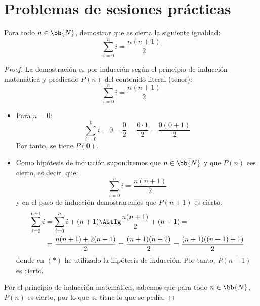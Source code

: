 \section{Problemas de sesiones prácticas}

\begin{ejercicio}\label{ej:1.1}
    Para todo $n\in \bb{N}$, demostrar que es cierta la siguiente igualdad:
    \begin{equation*}
        \sum_{i=0}^n i = \dfrac{n(n+1)}{2}
    \end{equation*}
    \begin{proof}
        La demostración es por inducción según el principio de inducción matemática y predicado $P(n)$ del contenido literal (tenor):
        \begin{equation*}
            \sum_{i=0}^n i = \dfrac{n(n+1)}{2}
        \end{equation*}

        \begin{itemize}
            \item \ul{Para $n=0$}:
            \begin{equation*}
                \sum_{i=0}^0 i = 0 = \frac{0}{2} = \frac{0\cdot 1}{2}
                 = \dfrac{0(0+1)}{2}
            \end{equation*}
            Por tanto, se tiene $P(0)$.

            \item Como hipótesis de inducción supondremos que $n\in \bb{N}$ y que $P(n)$ ees cierto, es decir, que:
            \begin{equation*}
                \sum_{i=0}^n i = \dfrac{n(n+1)}{2}
            \end{equation*}
            y en el paso de inducción demostraremos que $P(n+1)$ es cierto.
            \begin{align*}
                \sum_{i=0}^{n+1} i &= \sum_{i=0}^n i + (n+1)
                \AstIg \dfrac{n(n+1)}{2} + (n+1)
                =\\&= \dfrac{n(n+1) + 2(n+1)}{2}
                = \dfrac{(n+1)(n+2)}{2}
                = \dfrac{(n+1)((n+1)+1)}{2}
            \end{align*}
            donde en $(\ast)$ he utilizado la hipótesis de inducción. Por tanto, $P(n+1)$ es cierto.
        \end{itemize}

        Por el principio de inducción matemática, sabemos que para todo $n\in \bb{N}$, $P(n)$ es cierto, por lo que se tiene lo que se pedía.
    \end{proof}
\end{ejercicio}

